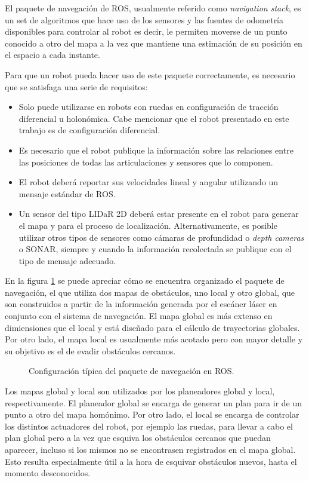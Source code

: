 El paquete de navegación de ROS, usualmente referido como \textit{navigation stack}, es un set de algoritmos que hace uso de los sensores y las fuentes de odometría disponibles para controlar al robot es decir, le permiten moverse de un punto conocido a otro del mapa a la vez que mantiene una estimación de su posición en el espacio a cada instante.

Para que un robot pueda hacer uso de este paquete correctamente, es necesario que se satisfaga una serie de requisitos:
\begin{itemize}
    \item Solo puede utilizarse en robots con ruedas en configuración de tracción diferencial u holonómica. Cabe mencionar que el robot presentado en este trabajo es de configuración diferencial.
    \item Es necesario que el robot publique la información sobre las relaciones entre las posiciones de todas las articulaciones y sensores que lo componen.
    \item El robot deberá reportar sus velocidades lineal y angular utilizando un mensaje estándar de ROS.
    \item Un sensor del tipo LIDaR 2D deberá estar presente en el robot para generar el mapa y para el proceso de localización. Alternativamente, es posible utilizar otros tipos de sensores como cámaras de profundidad o \textit{depth cameras} o SONAR, siempre y cuando la información recolectada se publique con el tipo de mensaje adecuado.
\end{itemize}

En la figura \ref{fig:navigationStack} se puede apreciar cómo se encuentra organizado el paquete de navegación, el que utiliza dos mapas de obstáculos, uno local y otro global, que son construidos a partir de la información generada por el escáner láser en conjunto con el sistema de navegación. El mapa global es más extenso en dimiensiones que el local y está diseñado para el cálculo de trayectorias globales. Por otro lado, el mapa local es usualmente más acotado pero con mayor detalle y su objetivo es el de evadir obstáculos cercanos.

\begin{figure}[ht]
    \centering
    \def\svgwidth{350pt}
    
    \caption{Configuración típica del paquete de navegación en ROS.}
    \label{fig:navigationStack}
\end{figure}

Los mapas global y local son utilizados por los planeadores global y local, respectivamente. El planeador global se encarga de generar un plan para ir de un punto a otro del mapa homónimo. Por otro lado, el local se encarga de controlar los distintos actuadores del robot, por ejemplo las ruedas, para llevar a cabo el plan global pero a la vez que esquiva los obstáculos cercanos que puedan aparecer, incluso si los mismos no se encontrasen registrados en el mapa global. Esto resulta especialmente útil a la hora de esquivar obstáculos nuevos, hasta el momento desconocidos.

